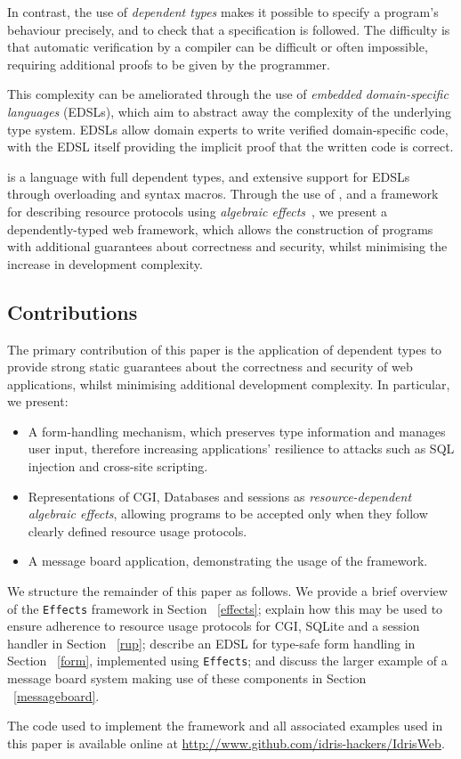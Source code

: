 In contrast, the use of \textit{dependent types} makes it possible
to specify a program's behaviour precisely, and to check that a 
specification is followed.
%
The difficulty is 
that automatic verification by a compiler can be difficult or
often impossible, requiring additional proofs to be given by the programmer.

This complexity can be ameliorated through the use of \textit{embedded
domain-specific languages} (EDSLs), which aim to abstract away the
complexity of the underlying type system. EDSLs allow domain experts to
write verified domain-specific code, with the EDSL itself providing the implicit proof that the written code is correct.

\idris{} \cite{brady2013idris} is a language with full dependent types, and
extensive support for EDSLs through overloading and syntax macros. Through the
use of \idris{}, and a framework for describing resource protocols using
\emph{algebraic effects}~\cite{brady:effects}, we
present a dependently-typed web framework, which allows the construction of
programs with additional guarantees about correctness and security, whilst
minimising the increase in development complexity. 

\subsection{Contributions}
The primary contribution of this paper is the application of 
dependent types to provide strong static guarantees
about the correctness and security of web applications, whilst minimising
additional development complexity. In particular, we present:

\begin{itemize}
\item A form-handling mechanism, which preserves type information and
manages user input, therefore
increasing applications' resilience to attacks such as SQL injection and cross-site scripting.

\item Representations of CGI, Databases and sessions as
\textit{resource-dependent algebraic effects}, allowing programs to be accepted only when they
follow clearly defined resource usage protocols.

\item A message board application, demonstrating the usage of the framework.

\end{itemize}

We structure the remainder of this paper as follows. We provide a brief
overview of the \texttt{Effects} framework in Section ~\ref{effects}; explain
how this may be used to ensure adherence to resource usage protocols for CGI,
SQLite and a session handler in Section ~\ref{rup}; describe an EDSL for
type-safe form handling in Section ~\ref{form}, implemented using
\texttt{Effects}; and discuss the larger example
of a message board system making use of these components in Section
~\ref{messageboard}.

The code used to implement the framework and all associated examples used in this paper is available online at \url{http://www.github.com/idris-hackers/IdrisWeb}.
